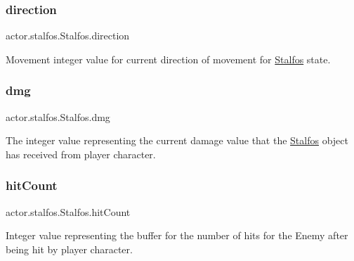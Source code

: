 \subsubsection{\texorpdfstring{direction}{direction}}
{\footnotesize\ttfamily actor.\+stalfos.\+Stalfos.\+direction}



Movement integer value for current direction of movement for \hyperlink{classactor_1_1stalfos_1_1_stalfos}{Stalfos} state. 

\mbox{\label{classactor_1_1stalfos_1_1_stalfos_a9d2a9b04c99612889141d0c89309beb1}} 
\subsubsection{\texorpdfstring{dmg}{dmg}}
{\footnotesize\ttfamily actor.\+stalfos.\+Stalfos.\+dmg}



The integer value representing the current damage value that the \hyperlink{classactor_1_1stalfos_1_1_stalfos}{Stalfos} object has received from player character. 

\mbox{\label{classactor_1_1stalfos_1_1_stalfos_aaebbd89b15752a9cca8e144dd6645b7b}} 
\subsubsection{\texorpdfstring{hit\+Count}{hitCount}}
{\footnotesize\ttfamily actor.\+stalfos.\+Stalfos.\+hit\+Count}



Integer value representing the buffer for the number of hits for the Enemy after being hit by player character. 

\mbox{\label{classactor_1_1stalfos_1_1_stalfos_acc6601a3d6ab3ff329bf2cd9f5186ef3}} 
